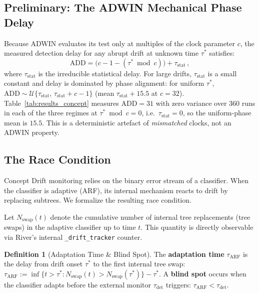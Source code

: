 \documentclass[10pt,conference]{IEEEtran}
\theoremstyle{definition}
\newtheorem{definition}[theorem]{Definition}
\begin{document}
\subsection{Preliminary: The ADWIN Mechanical Phase Delay}\label{sec:clock}

Because ADWIN evaluates its test only at multiples of the clock parameter $c$, the measured detection delay for any abrupt drift at unknown time $\tau^*$ satisfies:
\begin{equation}\label{eq:clock}
  \mathrm{ADD} = \bigl(c - 1 - (\tau^* \bmod c)\bigr) + \tau_{\mathrm{stat}}\,,
\end{equation}
where $\tau_{\mathrm{stat}}$ is the irreducible statistical delay. For large drifts, $\tau_{\mathrm{stat}}$ is a small constant and delay is dominated by phase alignment: for uniform $\tau^*$, $\mathrm{ADD} \sim \mathcal{U}\{\tau_{\mathrm{stat}},\, \tau_{\mathrm{stat}} + c - 1\}$ (mean $\tau_{\mathrm{stat}} + 15.5$ at $c{=}32$). Table~\ref{tab:results_concept} measures $\mathrm{ADD} = 31$ with zero variance over $360$ runs in each of the three regimes at $\tau^{*} \bmod c = 0$, i.e.\ $\tau_{\mathrm{stat}} = 0$, so the uniform-phase mean is $15.5$. This is a deterministic artefact of \emph{mismatched} clocks, not an ADWIN property.

\subsection{The Race Condition}\label{sec:race}

Concept Drift monitoring relies on the binary error stream of a classifier.
When the classifier is adaptive (ARF), its internal mechanism reacts to drift by replacing subtrees.
We formalize the resulting race condition.

Let $N_{\mathrm{swap}}(t)$ denote the cumulative number of internal tree replacements (tree swaps) in the adaptive classifier up to time $t$. This quantity is directly observable via River's internal \texttt{\_drift\_tracker} counter.

\begin{definition}[Adaptation Time \& Blind Spot]\label{def:tau_arf}
  The \textbf{adaptation time} $\tau_{\mathrm{ARF}}$ is the delay from drift onset $\tau^*$ to the first internal tree swap: $\tau_{\mathrm{ARF}} := \inf\bigl\{t > \tau^* : N_{\mathrm{swap}}(t) > N_{\mathrm{swap}}(\tau^*) \bigr\} - \tau^*$.
  A \textbf{blind spot} occurs when the classifier adapts before the external monitor $\tau_{\mathrm{det}}$ triggers: $\tau_{\mathrm{ARF}} < \tau_{\mathrm{det}}$.
\end{definition}
\end{document}
